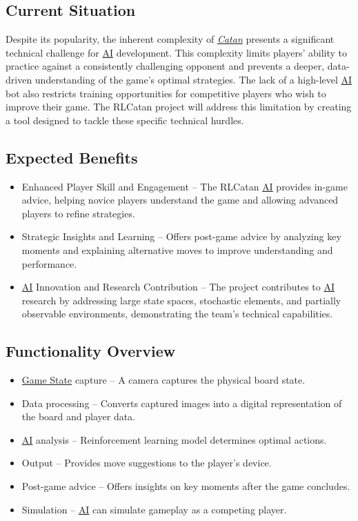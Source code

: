 \documentclass{article}
\newcommand{\Catan}{\href{https://en.wikipedia.org/wiki/Catan}{Catan}}
\newcommand{\AI}{\href{https://en.wikipedia.org/wiki/Artificial_intelligence}{AI}}
\newcommand{\GameState}{\href{https://milvus.io/ai-quick-reference/what-is-a-state-in-rl}{Game State}}
\begin{document}
\subsection{Current Situation}\label{subsec:current-situation}
Despite its popularity, the inherent complexity of \emph{\Catan{}} presents a significant technical challenge for \AI{} development. This complexity limits players' ability to practice against a consistently challenging opponent and prevents a deeper, data-driven understanding of the game's optimal strategies. The lack of a high-level \AI{} bot also restricts training opportunities for competitive players who wish to improve their game. The RLCatan project will address this limitation by creating a tool designed to tackle these specific technical hurdles.

\subsection{Expected Benefits}\label{subsec:expected-benefits}
\begin{itemize}
    \item {Enhanced Player Skill and Engagement} – The RLCatan \AI{} provides in-game advice, helping novice players understand the game and allowing advanced players to refine strategies.
    \item {Strategic Insights and Learning} – Offers post-game advice by analyzing key moments and explaining alternative moves to improve understanding and performance.
    \item {\AI{} Innovation and Research Contribution} – The project contributes to \AI{} research by addressing large state spaces, stochastic elements, and partially observable environments, demonstrating the team's technical capabilities.
\end{itemize}

\subsection{Functionality Overview}\label{subsec:functionality-overview}
\begin{itemize}
    \item {\GameState{} capture} – A camera captures the physical board state.
    \item {Data processing} – Converts captured images into a digital representation of the board and player data.
    \item {\AI{} analysis} – Reinforcement learning model determines optimal actions.
    \item {Output} – Provides move suggestions to the player's device.
    \item {Post-game advice} – Offers insights on key moments after the game concludes.
    \item {Simulation} – \AI{} can simulate gameplay as a competing player.
\end{itemize}
\end{document}
